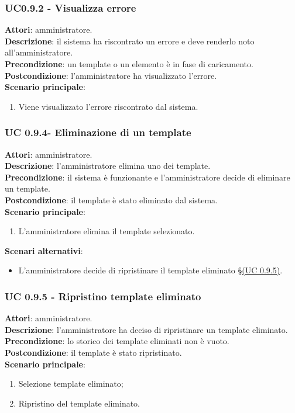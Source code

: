 \subsubsection{UC0.9.2 - Visualizza errore}{
	\label{uc0.9.2}
	\textbf{Attori}: amministratore. \\
	\textbf{Descrizione}: il sistema ha riscontrato un errore e deve renderlo noto all'amministratore. \\
	\textbf{Precondizione}: un template o un elemento è in fase di caricamento.	\\
	\textbf{Postcondizione}: l'amministratore ha visualizzato l'errore.	\\
	\textbf{Scenario principale}:
	\begin{enumerate}
		\item Viene visualizzato l'errore riscontrato dal sistema.
	\end{enumerate}
	}
\subsubsection{UC 0.9.4- Eliminazione di un template}{
	\label{uc0.9.4}
	\textbf{Attori}: amministratore. \\
	\textbf{Descrizione}: l'amministratore elimina uno dei template. \\
	\textbf{Precondizione}: il sistema è funzionante e l'amministratore decide di eliminare un template.	\\
	\textbf{Postcondizione}: il template è stato eliminato dal sistema.	\\
	\textbf{Scenario principale}:
	\begin{enumerate}
		\item L’amministratore elimina il template selezionato.
	\end{enumerate}
	\textbf{Scenari alternativi}:
	\begin{itemize}
		\item L'amministratore decide di ripristinare il template eliminato \S\hyperref[uc0.9.5]{(UC 0.9.5)}.
	\end{itemize}
	}
\subsubsection{UC 0.9.5 - Ripristino template eliminato}{
	\label{uc0.9.5}
	\textbf{Attori}: amministratore. \\
	\textbf{Descrizione}: l'amministratore ha deciso di ripristinare un template eliminato. \\
	\textbf{Precondizione}: lo storico dei template eliminati non è vuoto.	\\
	\textbf{Postcondizione}: il template è stato ripristinato.	\\
	\textbf{Scenario principale}:
	\begin{enumerate}
		\item Selezione template eliminato; 
		\item Ripristino del template eliminato.
	\end{enumerate}
	}